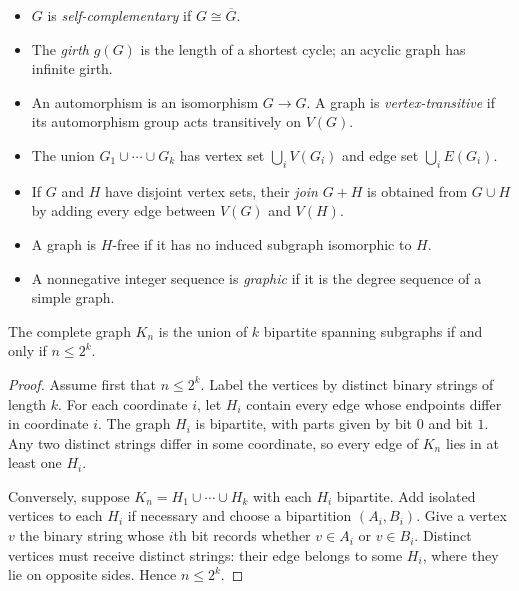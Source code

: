 \begin{notedefinition}
\begin{itemize}
  \item $G$ is \emph{self-complementary} if $G\cong\overline G$.
  \item The \emph{girth} $g(G)$ is the length of a shortest cycle; an acyclic graph has infinite girth.
  \item An automorphism is an isomorphism $G\to G$.  A graph is \emph{vertex-transitive} if its automorphism group acts transitively on $V(G)$.
  \item The union $G_1\cup\cdots\cup G_k$ has vertex set $\bigcup_iV(G_i)$ and edge set $\bigcup_iE(G_i)$.
  \item If $G$ and $H$ have disjoint vertex sets, their \emph{join} $G+H$ is obtained from $G\cup H$ by adding every edge between $V(G)$ and $V(H)$.
  \item A graph is $H$-free if it has no induced subgraph isomorphic to $H$.
  \item A nonnegative integer sequence is \emph{graphic} if it is the degree sequence of a simple graph.
\end{itemize}
\end{notedefinition}
\begin{notetheorem}
The complete graph $K_n$ is the union of $k$ bipartite spanning subgraphs if and only if $n\le 2^k$.
\end{notetheorem}
\begin{proof}
Assume first that $n\le2^k$.  Label the vertices by distinct binary strings of length $k$.  For each coordinate $i$, let $H_i$ contain every edge whose endpoints differ in coordinate $i$.  The graph $H_i$ is bipartite, with parts given by bit $0$ and bit $1$.  Any two distinct strings differ in some coordinate, so every edge of $K_n$ lies in at least one $H_i$.

Conversely, suppose $K_n=H_1\cup\cdots\cup H_k$ with each $H_i$ bipartite.  Add isolated vertices to each $H_i$ if necessary and choose a bipartition $(A_i,B_i)$.  Give a vertex $v$ the binary string whose $i$th bit records whether $v\in A_i$ or $v\in B_i$.  Distinct vertices must receive distinct strings: their edge belongs to some $H_i$, where they lie on opposite sides.  Hence $n\le2^k$.
\end{proof}

